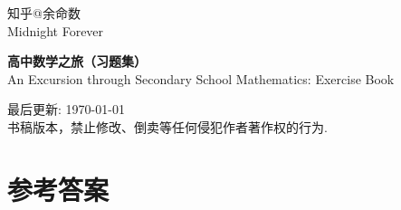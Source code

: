 \documentclass[12pt,a4paper,oneside]{ctexbook}
\theoremstyle{definition}
\theoremstyle{remark}
\begin{document}


{ 
	\thispagestyle{empty} 
	\begin{titlepage}
		\thispagestyle{empty} 
		\begin{flushleft}
			\vspace*{2cm}
			
			{\large
				知乎@余命数 \\
				Midnight Forever
			}
			
			\vspace{4cm}
			
			{\fontsize{36}{44}\selectfont\bfseries 高中数学之旅（习题集）}\\[2cm]

			{\fontsize{22}{28}\selectfont An Excursion through Secondary School Mathematics: Exercise Book}

			\vspace{2cm}

			\vfill

			{\small
				最后更新: \today \\
				书稿版本，禁止修改、倒卖等任何侵犯作者著作权的行为.
			}
		\end{flushleft}
	\end{titlepage}
}

	
	\frontmatter
	\pagestyle{plain}
	\tableofcontents
	
	\mainmatter
	
	
	
	\chapter{参考答案}
	
	
	


\end{document}
